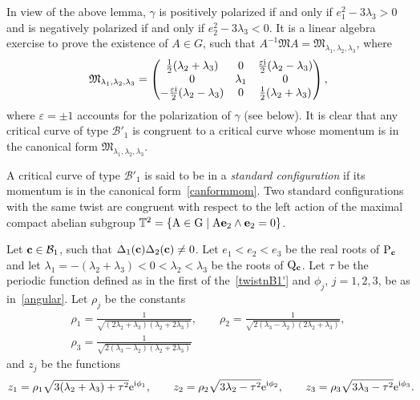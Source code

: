 \documentclass[pdftex]{sigma}
\numberwithin{equation}{section}
\begin{document}
\begin{Remark}
In view of the above lemma, $\gamma$ is positively polarized if and only if
{$e_1^2-3\lambda_3>0$}
and is negatively polarized if and only if
{$e_2^2-3\lambda_3<0$}.
It is a linear algebra exercise to prove the existence of ${A}\in {G}$, such that
${A}^{-1}{\mathfrak M}{A}={\mathfrak M}_{\lambda_1,\lambda_2,\lambda_3}$, where
\begin{equation}\label{canformmom}
{\mathfrak M}_{\lambda_1,\lambda_2,\lambda_3}=\begin{pmatrix}
\frac{1}{2}(\lambda_2+\lambda_3) & 0& \frac{\varepsilon{\rm i}}{2}(\lambda_2-\lambda_3)\\
0 &\lambda_1& 0 \\
- \frac{\varepsilon{\rm i}}{2}(\lambda_2-\lambda_3)&0&\frac{1}{2}(\lambda_2+\lambda_3) \\
 \end{pmatrix},
 \end{equation}
where
{$\varepsilon=\pm 1$}
accounts for the polarization of $\gamma$ (see below).
It is clear that any critical curve of type ${\mathcal B}'_1$ is congruent to a critical curve whose momentum
is in the canonical form ${\mathfrak M}_{\lambda_1,\lambda_2,\lambda_3}$.
 \end{Remark}

 \begin{Definition}
 A critical curve of type ${\mathcal B}'_1$ is said to be in a \emph{standard configuration} if its momentum is in
 the canonical form~\eqref{canformmom}. Two standard configurations with the same twist are congruent
 with respect to the left action of the maximal compact abelian subgroup
 ${\mathbb T}^2=\{{\rm A}\in {\rm G} \mid {\rm A}{\bf e}_2\wedge {\bf e}_2=0\}$.
 \end{Definition}

Let ${\bf c}\in {\mathcal B}_1$, such that {$\Delta_1({\bf c})\Delta_2({\bf c})\neq 0$}.
Let $e_1<e_2<e_3$ be the real roots of ${\rm P}_{{\bf c}}$ and let
$\lambda_1=-(\lambda_2+\lambda_3)<0<\lambda_2<\lambda_3$ be the roots of ${\rm Q}_{{\bf c}}$.
Let $\tau$ be the periodic function defined as in {the first of the}~\eqref{twistnB1'} and $\phi_j$, $j=1,2,3$,
be as in~\eqref{angular}.
Let $\rho_j$ be the constants
\begin{gather*}
\rho_1=\frac{1}{\sqrt{(2\lambda_2+\lambda_3)(\lambda_2+2\lambda_3)}},\qquad
 \rho_2=\frac{1}{\sqrt{2(\lambda_3-\lambda_2)(2\lambda_2+\lambda_3)}},\\
\rho_3=\frac{1}{\sqrt{2(\lambda_3-\lambda_2)(\lambda_2+2\lambda_3)}}
\end{gather*}
and $z_j$ be the functions
\begin{gather}
z_1=\rho_1\sqrt{3(\lambda_2+\lambda_3)+\tau^2}{\rm e}^{{\rm i}\phi_1},\qquad
z_2=\rho_2\sqrt{3\lambda_2-\tau^2}{\rm e}^{{\rm i}\phi_2},\qquad
z_3=\rho_3\sqrt{3\lambda_3-\tau^2}{\rm e}^{{\rm i}\phi_3}.\!\!\!\label{functions}
\end{gather}
\end{document}
